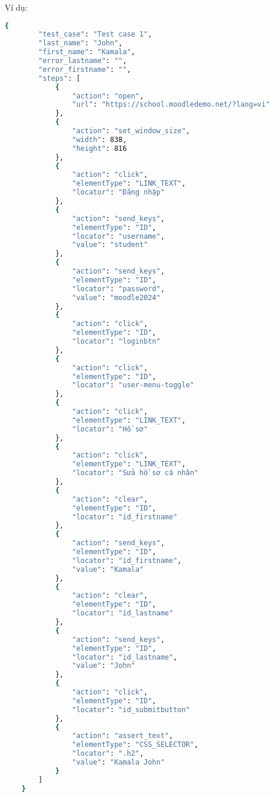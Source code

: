 Ví dụ:
\begin{lstlisting}[language=bash, caption={Ví dụ testcase ESN-001-0001 ở level 2}]
    {
        "test_case": "Test case 1",
        "last_name": "John",
        "first_name": "Kamala",
        "error_lastname": "",
        "error_firstname": "",
        "steps": [
            {
                "action": "open",
                "url": "https://school.moodledemo.net/?lang=vi"
            },
            {
                "action": "set_window_size",
                "width": 838,
                "height": 816
            },
            {
                "action": "click",
                "elementType": "LINK_TEXT",
                "locator": "Đăng nhập"
            },
            {
                "action": "send_keys",
                "elementType": "ID",
                "locator": "username",
                "value": "student"
            },
            {
                "action": "send_keys",
                "elementType": "ID",
                "locator": "password",
                "value": "moodle2024"
            },
            {
                "action": "click",
                "elementType": "ID",
                "locator": "loginbtn"
            },
            {
                "action": "click",
                "elementType": "ID",
                "locator": "user-menu-toggle"
            },
            {
                "action": "click",
                "elementType": "LINK_TEXT",
                "locator": "Hồ sơ"
            },
            {
                "action": "click",
                "elementType": "LINK_TEXT",
                "locator": "Sửa hồ sơ cá nhân"
            },
            {
                "action": "clear",
                "elementType": "ID",
                "locator": "id_firstname"
            },
            {
                "action": "send_keys",
                "elementType": "ID",
                "locator": "id_firstname",
                "value": "Kamala"
            },
            {
                "action": "clear",
                "elementType": "ID",
                "locator": "id_lastname"
            },
            {
                "action": "send_keys",
                "elementType": "ID",
                "locator": "id_lastname",
                "value": "John"
            },
            {
                "action": "click",
                "elementType": "ID",
                "locator": "id_submitbutton"
            },
            {
                "action": "assert_text",
                "elementType": "CSS_SELECTOR",
                "locator": ".h2",
                "value": "Kamala John"
            }
        ]
    }
\end{lstlisting}
